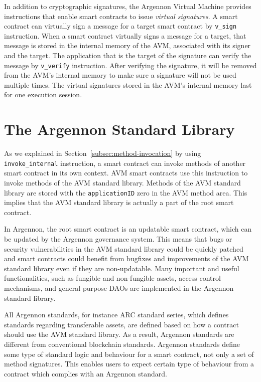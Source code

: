 
In addition to cryptographic signatures, the Argennon Virtual Machine provides instructions that enable
smart contracts to issue \emph{virtual signatures}. A smart contract can virtually sign a message for a target
smart contract by \texttt{v\_sign} instruction. When a smart contract
virtually signs a message for a target, that message is stored in the internal memory of the AVM, associated with
its signer and the target. The application that is the target of the signature can verify the message
by \texttt{v\_verify} instruction. After verifying the signature, it will be removed from the AVM's internal memory
to make sure a signature will not be used multiple times. The virtual signatures stored in the AVM's internal memory
last for one execution session.



\section{The Argennon Standard Library}\label{sec:asl}

As we explained in Section~\ref{subsec:method-invocation} by using \texttt{invoke\_internal} instruction, a smart
contract can invoke methods of another smart contract in its own context. AVM smart contracts use this instruction to
invoke methods of the AVM standard library. Methods of the AVM standard library are stored
with the \texttt{applicationID} zero in the AVM method area. This implies that the AVM standard library is actually
a part of the root smart contract.

In Argennon, the root smart contract is an updatable smart contract, which can be updated by the Argennon governance
system. This means that bugs or security vulnerabilities in the AVM standard library could be quickly patched and
smart contracts could benefit from bugfixes and improvements of the AVM standard library even if they are
non-updatable. Many important and useful functionalities,
such as fungible and non-fungible assets, access control mechanisms,
and general purpose DAOs are implemented in the Argennon standard library.

All Argennon standards, for instance ARC standard series, which defines standards regarding transferable assets,
are defined based on how a contract should use the AVM standard library. As a result, Argennon standards are
different from conventional blockchain standards. Argennon standards define some type of standard logic and
behaviour for a smart contract, not only a set of method signatures. This enables users to expect certain type
of behaviour from a contract which complies with an Argennon standard.
